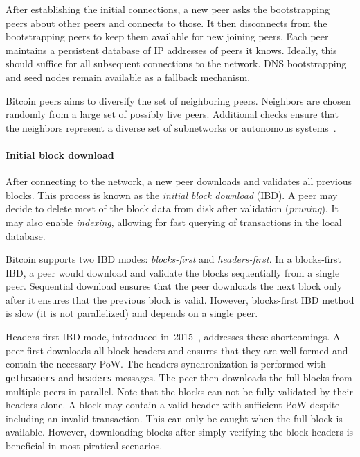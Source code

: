 After establishing the initial connections, a new peer asks the bootstrapping peers about other peers and connects to those.
It then disconnects from the bootstrapping peers to keep them available for new joining peers.
Each peer maintains a persistent database of IP addresses of peers it knows.
Ideally, this should suffice for all subsequent connections to the network.
DNS bootstrapping and seed nodes remain available as a fallback mechanism.

Bitcoin peers aims to diversify the set of neighboring peers.
Neighbors are chosen randomly from a large set of possibly live peers.
Additional checks ensure that the neighbors represent a diverse set of subnetworks or autonomous systems~\cite{Naumenko2019a}.


\paragraph{Initial block download}

After connecting to the network, a new peer downloads and validates all previous blocks.
This process is known as the \textit{initial block download} (IBD).
A peer may decide to delete most of the block data from disk after validation (\textit{pruning}).
It may also enable \textit{indexing}, allowing for fast querying of transactions in the local database.

Bitcoin supports two IBD modes: \textit{blocks-first} and \textit{headers-first}.
In a blocks-first IBD, a peer would download and validate the blocks sequentially from a single peer.
Sequential download ensures that the peer downloads the next block only after it ensures that the previous block is valid.
However, blocks-first IBD method is slow (it is not parallelized) and depends on a single peer.

Headers-first IBD mode, introduced in~2015~\cite{Core2015}, addresses these shortcomings.
A peer first downloads all block headers and ensures that they are well-formed and contain the necessary PoW.
The headers synchronization is performed with \texttt{getheaders} and \texttt{headers} messages.
The peer then downloads the full blocks from multiple peers in parallel.
Note that the blocks can not be fully validated by their headers alone.
A block may contain a valid header with sufficient PoW despite including an invalid transaction.
This can only be caught when the full block is available.
However, downloading blocks after simply verifying the block headers is beneficial in most piratical scenarios.


